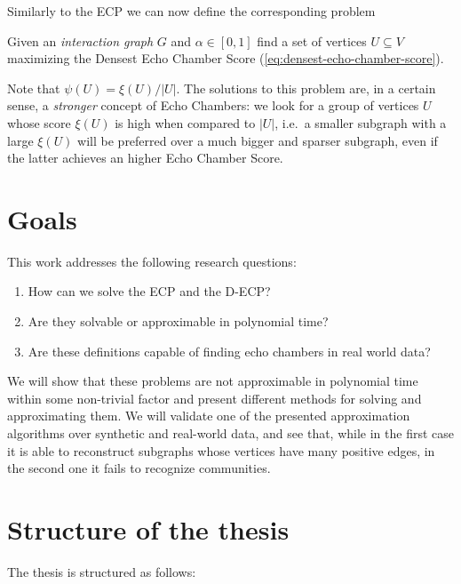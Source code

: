 Similarly to the \acrshort{ECP} we can now define the corresponding problem

\begin{problem}
Given an \emph{interaction graph} $G$ and $\alpha \in [0, 1]$ find a set of vertices $U \subseteq
	V$ maximizing the Densest Echo Chamber Score (\autoref{eq:densest-echo-chamber-score}).
\end{problem}

Note that $\psi(U) = \xi(U) / |U|$. The solutions to this problem are, in a certain sense, a \emph{stronger} concept of Echo
Chambers: we look for a group of vertices $U$ whose
score $\xi(U)$ is high when compared to $|U|$, i.e.\ a smaller subgraph with a
large $\xi(U)$ will be preferred over a much bigger and sparser subgraph, even
if the latter achieves an higher Echo Chamber Score.

\section{Goals}
\label{sec:goals}

This work addresses the following research questions:

\begin{enumerate}
	\item How can we solve the \acrlong{ECP} and the \acrlong{D-ECP}?
	\item Are they solvable or approximable in polynomial time?
	\item Are these definitions capable of finding echo chambers in real world
	      data?
\end{enumerate}

We will show that these problems are not approximable in polynomial time within
some non-trivial factor and present different methods for solving and
approximating them. We will validate one of the presented approximation
algorithms over synthetic and real-world data, and see that, while in the first
case it is able to reconstruct subgraphs whose vertices have many positive edges, in
the second one it fails to recognize communities.

\section{Structure of the thesis}
\label{sec:structure-thesis}

The thesis is structured as follows:

